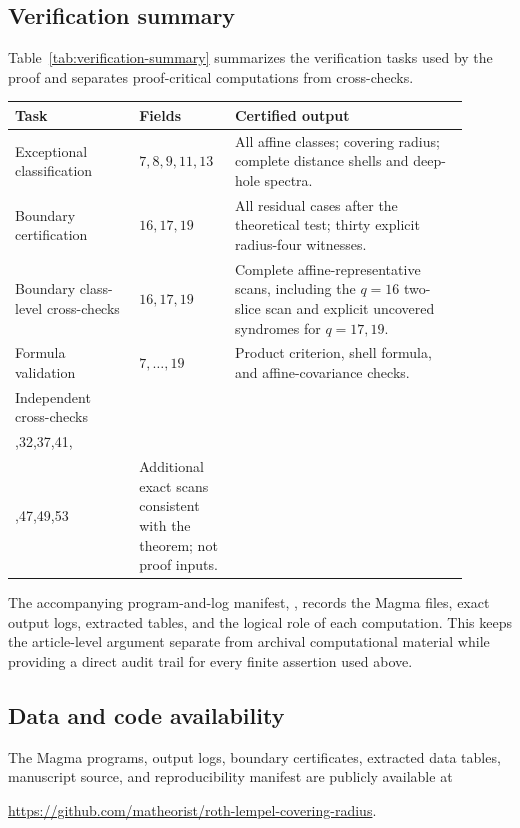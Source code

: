 \documentclass[11pt]{article}
\theoremstyle{plain}
\theoremstyle{definition}
\begin{document}
\subsection*{Verification summary}
Table~\ref{tab:verification-summary} summarizes the verification tasks used
by the proof and separates proof-critical computations from cross-checks.
\begin{center}
\label{tab:verification-summary}
\small
\begin{tabular}{>{\raggedright\arraybackslash}p{0.25\linewidth}
                >{\raggedright\arraybackslash}p{0.18\linewidth}
                >{\raggedright\arraybackslash}p{0.47\linewidth}}
\toprule
Task & Fields & Certified output\\
\midrule
Exceptional classification &
\(7,8,9,11,13\) &
All affine classes; covering radius; complete distance shells and
deep-hole spectra.\\
Boundary certification &
\(16,17,19\) &
All residual cases after the theoretical test; thirty explicit
radius-four witnesses.\\
Boundary class-level cross-checks &
\(16,17,19\) &
Complete affine-representative scans, including the \(q=16\) two-slice
scan and explicit uncovered syndromes for \(q=17,19\).\\
Formula validation &
\(7,\ldots,19\) &
Product criterion, shell formula, and affine-covariance checks.\\
Independent cross-checks &
\(\begin{gathered}23,25,27,29,\\
31,32,37,41,\\
43,47,49,53\end{gathered}\) &
Additional exact scans consistent with the theorem; not proof inputs.\\
\bottomrule
\end{tabular}
\end{center}

The accompanying program-and-log manifest,
, records the
Magma files, exact output logs, extracted tables, and the logical role of
each computation.  This keeps the article-level argument separate from
archival computational material while providing a direct audit trail for
every finite assertion used above.

\subsection*{Data and code availability}
The Magma programs, output logs, boundary certificates, extracted data
tables, manuscript source, and reproducibility manifest are publicly
available at
\begin{center}
\url{https://github.com/matheorist/roth-lempel-covering-radius}.
\end{center}
\end{document}
